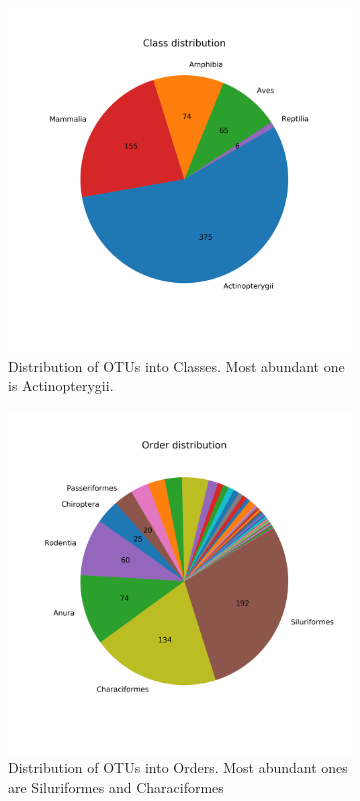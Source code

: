 \begin{figure}[h]
	\centering
	\begin{subfigure}{0.45\textwidth}
		\includegraphics[width=\textwidth]{classdistrpie}
		\caption{Distribution of OTUs into Classes. Most abundant one is Actinopterygii.}
		\label{fig:classpie}
	\end{subfigure}
	\begin{subfigure}{0.45\textwidth}
		\includegraphics[width=\textwidth]{orderdistrpie}
		\caption{Distribution of OTUs into Orders. Most abundant ones are Siluriformes and Characiformes}
		\label{fig:orderpie}
	\end{subfigure}
\caption{}
\label{fig:distr}
\end{figure}

